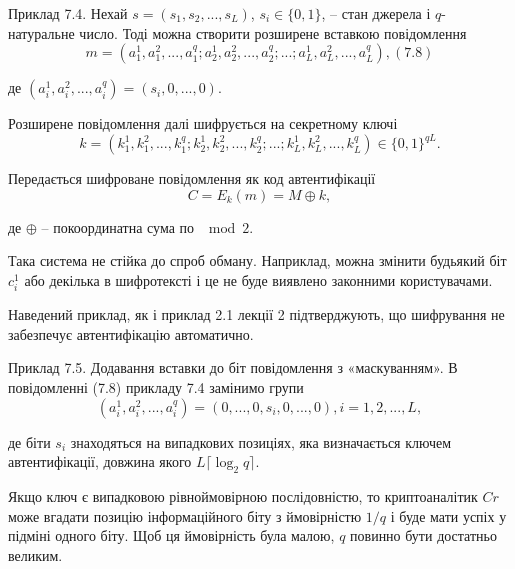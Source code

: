 \begin{example}
    Приклад 7.4. Нехай $s = (s_1, s_2, ..., s_L)$, $s_i \in \{0, 1\}$, -- стан джерела і $q$-
    натуральне число. Тоді можна створити розширене вставкою повідомлення
    \begin{equation}
        m = (a_1^1, a_1^2, ..., a_1^q; a_2^1, a_2^2, ..., a_2^q; ...; a_L^1, a_L^2, ..., a_L^q), (7.8)
    \end{equation}
    
    де $(a_i^1, a_i^2, ..., a_i^q) = (s_i, 0, ..., 0)$.
    
    Розширене повідомлення далі шифрується на секретному ключі
    \begin{equation*}
        k = (k_1^1, k_1^2, ..., k_1^q; k_2^1, k_2^2, ..., k_2^q; ...; k_L^1, k_L^2, ..., k_L^q) \in \{0, 1\}^{qL}.
    \end{equation*}
    
    Передається шифроване повідомлення як код автентифікації
    \begin{equation*}
        C = E_k(m) = M \oplus k,
    \end{equation*}
    
    де $\oplus$ -- покоординатна сума по $\mod{2}$.
\end{example}

Така система не стійка до спроб обману. Наприклад, можна змінити будьякий біт $c_i^1$
або декілька в шифротексті і це не буде виявлено законними
користувачами.

Наведений приклад, як і приклад 2.1 лекції 2 підтверджують, що
шифрування не забезпечує автентифікацію автоматично.

\begin{example}
    Приклад 7.5. Додавання вставки до біт повідомлення з «маскуванням».
    В повідомленні (7.8) прикладу 7.4 замінимо групи
    \begin{equation*}
        (a_i^1, a_i^2, ..., a_i^q)
        = (0, ..., 0, s_i, 0, ..., 0),
        i = 1, 2, ..., L,
    \end{equation*}
    
    де біти $s_i$ знаходяться на випадкових позиціях, яка визначається ключем
    автентифікації, довжина якого $L\lceil \log_2 q \rceil$.
    
    Якщо ключ є випадковою рівноймовірною послідовністю, то
    криптоаналітик $Cr$ може вгадати позицію інформаційного біту з ймовірністю
    $1/q$ і буде мати успіх у підміні одного біту. Щоб ця ймовірність була малою,
    $q$ повинно бути достатньо великим.
\end{example}


